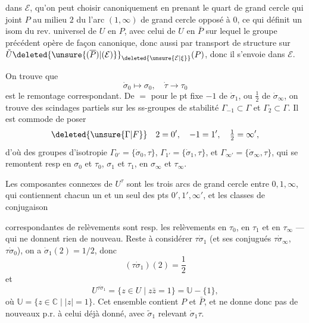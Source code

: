 
dans $\mathcal E$, qu'on peut choisir canoniquement en prenant le quart de grand cercle qui joint $P$ au milieu $2$ du  l'arc $(1,\infty)$ de grand cercle opposé à $0$, ce qui définit un isom du rev. universel de $U$ en $P$, avec celui de $U$ en $\bar P$ sur lequel le groupe précédent opère de façon canonique, donc aussi par transport de structure sur $\tilde U\deleted{\unsure{(\overline P)|(\mathcal E)}}_{\deleted{\unsure{\mathcal E|\xi}}}(P)$, donc il s'envoie dans $\mathcal E$.

On trouve que
\[
\dot\sigma_0\mapsto\sigma_0,\quad\dot\tau\to\tau_0
\]
est le remontage correspondant. De $=$ pour le pt fixe $-1$ de $\dot\sigma_1$, ou $\frac12$ de $\dot\sigma_\infty$, on trouve des scindages partiels sur les ss-groupes de  stabilité $\Gamma_{-1}\subset\Gamma$ et $\Gamma_2\subset\Gamma$. Il est commode de poser
\[
\deleted{\unsure{\Gamma|F}}\quad 2=0',\quad -1=1',\quad \tfrac12=\infty',
\]
d'où des groupes d'isotropie $\Gamma_{0'}=\{\dot\sigma_0,\tau\}$, $\Gamma_{1'}=\{\dot\sigma_1,\tau\}$, et $\Gamma_{\infty'}=\{\dot\sigma_\infty,\tau\}$, qui se remontent resp en $\sigma_0$ et $\tau_0$,  $\sigma_1$ et $\tau_1$, en $\sigma_\infty$ et $\tau_\infty$.

Les composantes connexes de $U^\tau$ sont les trois arcs de grand cercle entre $0,1,\infty$, qui contiennent chacun un  et un seul des pts $0',1',\infty'$, et les classes de conjugaison

correspondantes de relèvements  sont resp. les relèvements en $\tau_0$, en $\tau_1$ et en $\tau_\infty$ --- qui ne donnent rien de nouveau. Reste à considérer $\tau\dot\sigma_1$ (et ses conjugués  $\tau\dot\sigma_\infty$, $\tau\dot\sigma_0$), on a $\dot\sigma_1(2)=1/2$, donc
\[
(\tau\dot\sigma_1)(2)=\frac12
\]
et
\[
U^{\tau\dot\sigma_1}=\{z\in U\mid z\bar z=1\}=\mathbb U-\{1\},
\]
où $\mathbb U=\{z\in\mathbb C\mid|z|=1\}$. Cet ensemble contient $P$ et $\bar P$, et ne donne donc pas de nouveaux  p.r. à celui déjà donné, avec $\tilde\sigma_1$ relevant $\dot\sigma_1\tau$.

